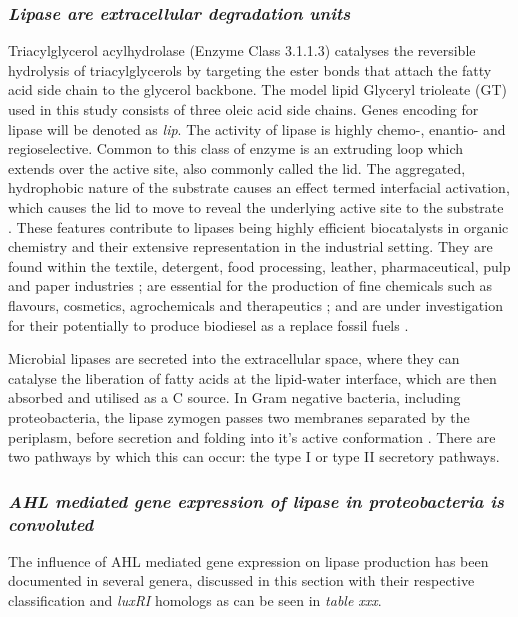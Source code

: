 \documentclass[11pt]{article}
\begin{document}
\subsubsection{\emph{Lipase are extracellular degradation units}}
Triacylglycerol acylhydrolase (Enzyme Class 3.1.1.3) catalyses the reversible hydrolysis of triacylglycerols by targeting the ester bonds that attach the fatty acid side chain to the glycerol backbone. The model lipid Glyceryl trioleate (GT) used in this study consists of three oleic acid side chains. Genes encoding for lipase will be denoted as \emph{lip}.
The activity of lipase is highly chemo-, enantio- and regioselective. Common to this class of enzyme is an extruding loop which extends over the active site, also commonly called the lid. The aggregated, hydrophobic nature of the substrate causes an effect termed interfacial activation, which causes the lid to move to reveal the underlying active site to the substrate \cite{derewenda1992,van_Tilbeurgh1993}. These features contribute to lipases being highly efficient biocatalysts in organic chemistry and their extensive representation in the industrial setting. 
They are found within the textile, detergent, food processing, leather, pharmaceutical, pulp and paper industries \cite{hasan_06}; are essential for the production of fine chemicals such as flavours, cosmetics, agrochemicals and therapeutics \cite{jaeger2002}; and are under investigation for their potentially to produce biodiesel as a replace fossil fuels \cite{hasan_06,iso2001}. 


Microbial lipases are secreted into the extracellular space, where they can catalyse the liberation of fatty acids at the lipid-water interface, which are then absorbed and utilised as a C source. In Gram negative bacteria, including proteobacteria, the lipase zymogen passes two membranes separated by the periplasm, before secretion and folding into it's active conformation \cite{bos2007,michel2009}. There are two pathways by which this can occur: the type I or type II secretory pathways. 


\subsubsection{\emph{AHL mediated gene expression of lipase in proteobacteria is convoluted}}
The influence of AHL mediated gene expression on lipase production has been documented in several genera, discussed in this section with their respective classification and \emph{luxRI} homologs as can be seen in \emph{table xxx}.
\end{document}
